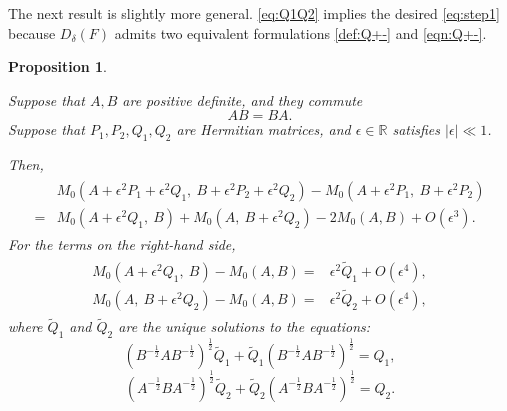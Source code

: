 \documentclass{article}
\numberwithin{equation}{section}
\newtheorem{proposition}[theorem]{Proposition}
\begin{document}
The next result is slightly more general. \eqref{eq:Q1Q2} implies the desired \eqref{eq:step1} because $D_{\delta}(F)$ admits two equivalent formulations \eqref{def:Q+-} and \eqref{eqn:Q+-}.
\begin{proposition}\label{prop:step1}


Suppose that $A, B$ are positive definite, and they commute $$AB = BA.$$ Suppose that $P_1, P_2, Q_1, Q_2$ are Hermitian matrices, and $\epsilon \in \mathbb{R}$ satisfies $|\epsilon| \ll 1$.

Then,
\begin{align}\label{eq:P1P2Q1Q2}
\begin{split}
    &M_0(A + \epsilon^2 P_1 + \epsilon^2 Q_1, \ B + \epsilon^2 P_2 + \epsilon^2 Q_2) - M_0(A + \epsilon^2 P_1, \ B + \epsilon^2 P_2) \\
    =& M_0(A + \epsilon^2 Q_1, \ B) + M_0(A, \ B + \epsilon^2 Q_2) - 2M_0(A, B) + O(\epsilon^3).
\end{split}
\end{align}
For the terms on the right-hand side,
\begin{align}\label{eq:Q1Q2}
\begin{split}
M_0(A + \epsilon^2 Q_1, \ B) - M_0(A, B) =& \epsilon^2 \tilde{Q}_1 + O(\epsilon^4),\\
M_0(A, \ B + \epsilon^2 Q_2) - M_0(A, B) =&\epsilon^2 \tilde{Q}_2 + O(\epsilon^4),
\end{split}
\end{align}
where $\tilde{Q}_1$ and $\tilde{Q}_2$ are the unique solutions to the equations:
\[
(B^{-\frac{1}{2}} A B^{-\frac{1}{2}})^{\frac{1}{2}} \tilde{Q}_1 + \tilde{Q}_1 (B^{-\frac{1}{2}} A B^{-\frac{1}{2}})^{\frac{1}{2}} = Q_1,
\]
\[
(A^{-\frac{1}{2}} B A^{-\frac{1}{2}})^{\frac{1}{2}} \tilde{Q}_2 + \tilde{Q}_2 (A^{-\frac{1}{2}} B A^{-\frac{1}{2}})^{\frac{1}{2}} = Q_2.
\]
\end{proposition}
\end{document}
